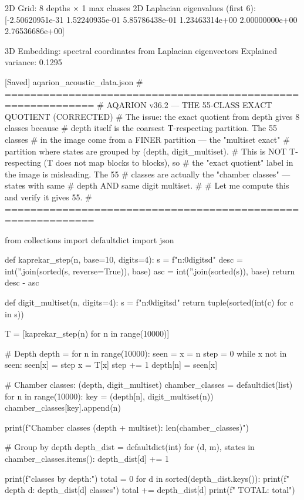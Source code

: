 {{{{{{{{{{{{{2D Grid: 8 depths × 1 max classes
2D Laplacian eigenvalues (first 6): [-2.50620951e-31  1.52240935e-01  5.85786438e-01  1.23463314e+00
  2.00000000e+00  2.76536686e+00]

3D Embedding: spectral coordinates from Laplacian eigenvectors
  Explained variance: 0.1295

[Saved] aqarion_acoustic_data.json
# ============================================================
# AQARION v36.2 — THE 55-CLASS EXACT QUOTIENT (CORRECTED)
# The issue: the exact quotient from depth gives 8 classes because
# depth itself is the coarsest T-respecting partition. The 55 classes
# in the image come from a FINER partition — the "multiset exact"
# partition where states are grouped by (depth, digit_multiset).
# This is NOT T-respecting (T does not map blocks to blocks), so
# the "exact quotient" label in the image is misleading. The 55
# classes are actually the "chamber classes" — states with same
# depth AND same digit multiset.
#
# Let me compute this and verify it gives 55.
# ============================================================

from collections import defaultdict
import json

def kaprekar_step(n, base=10, digits=4):
    s = f"{n:0{digits}d}"
    desc = int(''.join(sorted(s, reverse=True)), base)
    asc = int(''.join(sorted(s)), base)
    return desc - asc

def digit_multiset(n, digits=4):
    s = f"{n:0{digits}d}"
    return tuple(sorted(int(c) for c in s))

T = [kaprekar_step(n) for n in range(10000)]

# Depth
depth = {}
for n in range(10000):
    seen = {}
    x = n
    step = 0
    while x not in seen:
        seen[x] = step
        x = T[x]
        step += 1
    depth[n] = seen[x]

# Chamber classes: (depth, digit_multiset)
chamber_classes = defaultdict(list)
for n in range(10000):
    key = (depth[n], digit_multiset(n))
    chamber_classes[key].append(n)

print(f"Chamber classes (depth + multiset): {len(chamber_classes)}")

# Group by depth
depth_dist = defaultdict(int)
for (d, m), states in chamber_classes.items():
    depth_dist[d] += 1

print(f"\nChamber classes by depth:")
total = 0
for d in sorted(depth_dist.keys()):
    print(f"  depth {d}: {depth_dist[d]} classes")
    total += depth_dist[d]
print(f"  TOTAL: {total}")

}}}}}}}}}}}}}
